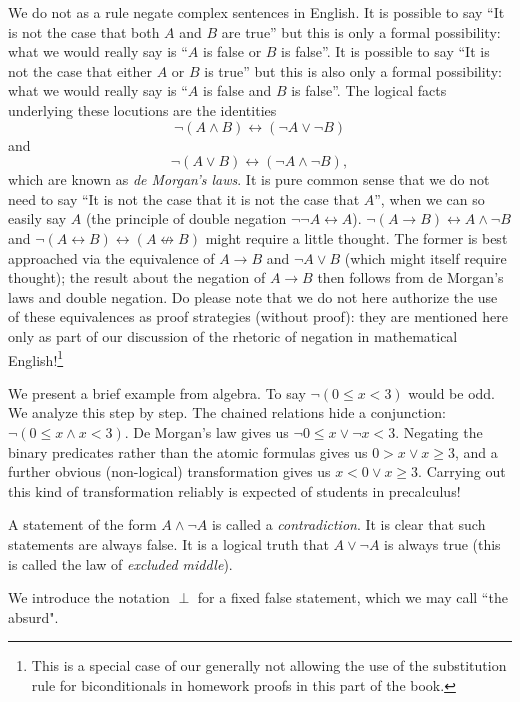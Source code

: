 \documentclass[12pt]{book}
\begin{document}
We do not as a rule negate complex sentences in English.  It is
possible to say ``It is not the case that both $A$ and $B$ are true''
but this is only a formal possibility: what we would really say is
``$A$ is false or $B$ is false''. It is
possible to say ``It is not the case that either  $A$ or $B$ is true''
but this is also only a formal possibility: what we would really say is
``$A$ is false and $B$ is false''.  The logical facts underlying these
locutions are the identities $$\neg(A \wedge B) \leftrightarrow (\neg
A \vee \neg B)$$ and
$$\neg(A \vee B) \leftrightarrow (\neg A \wedge \neg B),$$ which are known as
{\em de Morgan's laws\/}.  It is pure common sense that we do not need
to say ``It is not the case that it is not the case that $A$'', when
we can so easily say $A$ (the principle of double negation $\neg\neg A
\leftrightarrow A$).  $\neg(A \rightarrow B) \leftrightarrow A \wedge \neg B$ and
$\neg(A \leftrightarrow B) \leftrightarrow (A \not\leftrightarrow B)$ might require a little
thought.  The former is best approached via the equivalence of $A
\rightarrow B$ and $\neg A \vee B$ (which might itself require
thought); the result about the negation of $A \rightarrow B$ then
follows from de Morgan's laws and double negation.  Do please note
that we do not here authorize the use of these equivalences as proof
strategies (without proof): they are mentioned here only as part of
our discussion of the rhetoric of negation in mathematical English!\footnote{This is a special case of our generally not allowing the use of the substitution rule for biconditionals in homework proofs in this part of the book.}

We present a brief example from algebra.  To say $\neg(0 \leq x < 3)$ would be odd.  We analyze this step by step.
The chained relations hide a conjunction:  $\neg(0 \leq x \wedge x < 3)$.  De Morgan's law gives us $\neg 0 \leq x \vee \neg x < 3$.  Negating the binary predicates rather than the atomic formulas gives us $0 > x \vee x \geq 3$, and a further obvious (non-logical) transformation gives us $x < 0 \vee x \geq 3$.  Carrying out this kind of transformation reliably is expected of students in precalculus!

A statement of the form $A \wedge \neg A$ is called a {\em
contradiction\/}.  It is clear that such statements are always false.
It is a logical truth that $A \vee \neg A$ is always true (this is
called the law of {\em excluded middle\/}).

We introduce the notation $\perp$ for a fixed false statement, which we may call ``the absurd".
\end{document}
